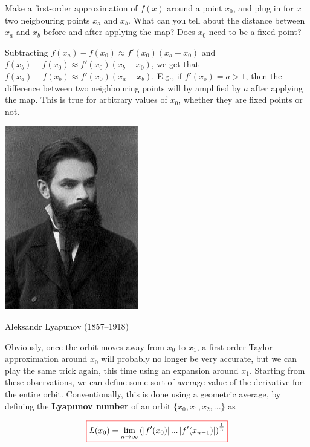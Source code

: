 \begin{cue}
Make a first-order approximation of $f(x)$ around a point $x_0$, and plug in for $x$ two neigbouring points $x_a$ and $x_b$. What can you tell about the distance between $x_a$ and $x_b$ before and after applying the map? Does $x_0$ need to be a fixed point?
\end{cue}

Subtracting $f(x_a) - f(x_0) \approx f'(x_0) (x_a - x_0)$ and  $f(x_b) - f(x_0) \approx f'(x_0) (x_b - x_0)$, we get that  $f(x_a) - f(x_b) \approx f'(x_0) (x_a - x_b)$. E.g., if  $f'(x_o)=a > 1$, then the difference between two neighbouring points will by amplified by $a$ after applying the map. This is true for arbitrary values of $x_0$, whether they are fixed points or not.

\begin{marginfigure}
\includegraphics{dynamic/figures/a_lyapunov}
\caption{Aleksandr Lyapunov (1857–1918)}
\end{marginfigure}

Obviously, once the orbit moves away from $x_0$ to $x_1$, a first-order Taylor approximation around $x_0$ will probably no longer be very accurate, but we can play the same trick again, this time using an expansion around $x_1$. Starting from these observations, we can define some sort of average value of the derivative for the entire orbit. Conventionally, this is done using a geometric average, by defining the \textbf{Lyapunov number} of an orbit $\{x_0, x_1, x_2, ... \}$ as

\begin{equation}
\fbox{$\displaystyle
  L(x_0) = \lim _{n \to \infty}\left(\left|f'(x_0)\right|...\left|f'(x_{n-1})\right|\right)^{\frac{1}{n}}
$}  
\end{equation} 

